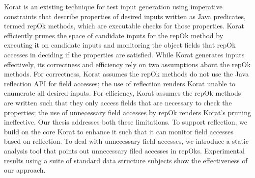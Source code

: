Korat is an existing technique for test input generation using imperative constraints that describe properties of desired inputs written as Java predicates, termed repOk methods, which are executable checks for those properties.  Korat efficiently prunes the space of candidate inputs for the repOk method by executing it on candidate inputs and monitoring the object fields that repOk accesses in deciding if the properties are satisfied.  While Korat generates inputs effectively, its correctness and efficiency rely on two assumptions about the repOk methods.  For correctness, Korat assumes the repOk methods do not use the Java reflection API for field accesses; the use of reflection renders Korat unable to enumerate all desired inputs.  For efficiency, Korat assumes the repOk methods are written such that they only access fields that are necessary to check the properties; the use of unnecessary field accesses by repOk renders Korat's pruning ineffective.  Our thesis addresses both these limitations.  To support reflection, we build on the core Korat to enhance it such that it can monitor field accesses based on reflection.  To deal with unnecessary field accesses, we introduce a static analysis tool that points out unnecessary filed accesses in repOks. Experimental results using a suite of standard data structure subjects show the effectiveness of our approach.
